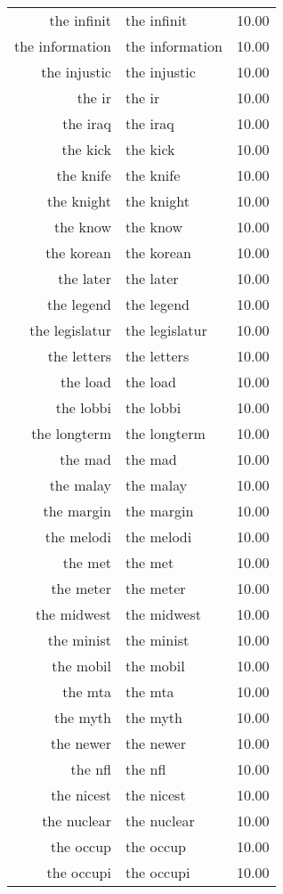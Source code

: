 \begin{table}[ht]
\begin{tabular}{rlr}
  the infinit & the infinit & 10.00 \\ 
  the information & the information & 10.00 \\ 
  the injustic & the injustic & 10.00 \\ 
  the ir & the ir & 10.00 \\ 
  the iraq & the iraq & 10.00 \\ 
  the kick & the kick & 10.00 \\ 
  the knife & the knife & 10.00 \\ 
  the knight & the knight & 10.00 \\ 
  the know & the know & 10.00 \\ 
  the korean & the korean & 10.00 \\ 
  the later & the later & 10.00 \\ 
  the legend & the legend & 10.00 \\ 
  the legislatur & the legislatur & 10.00 \\ 
  the letters & the letters & 10.00 \\ 
  the load & the load & 10.00 \\ 
  the lobbi & the lobbi & 10.00 \\ 
  the longterm & the longterm & 10.00 \\ 
  the mad & the mad & 10.00 \\ 
  the malay & the malay & 10.00 \\ 
  the margin & the margin & 10.00 \\ 
  the melodi & the melodi & 10.00 \\ 
  the met & the met & 10.00 \\ 
  the meter & the meter & 10.00 \\ 
  the midwest & the midwest & 10.00 \\ 
  the minist & the minist & 10.00 \\ 
  the mobil & the mobil & 10.00 \\ 
  the mta & the mta & 10.00 \\ 
  the myth & the myth & 10.00 \\ 
  the newer & the newer & 10.00 \\ 
  the nfl & the nfl & 10.00 \\ 
  the nicest & the nicest & 10.00 \\ 
  the nuclear & the nuclear & 10.00 \\ 
  the occup & the occup & 10.00 \\ 
  the occupi & the occupi & 10.00 \\ 

\end{tabular}
\end{table}
